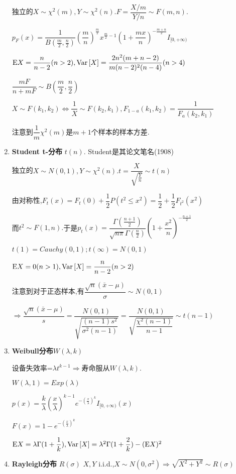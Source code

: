 \begin{enumerate}
   独立的$X\sim \chi^2(m),Y\sim\chi^2(n).F=\dfrac{X/m}{Y/n}\sim F(m,n).$

   $ p_{F}(x) =
   \dfrac{1}{B(\frac{m}{2},\frac{n}{2})}(\dfrac{m}{n})^{\frac{m}{2}}x^{\frac{m}{2}-1}(1+\dfrac{mx}{n})^{-\frac{m+n}{2}} I_{[0,+\infty)}$

   $ \text{E}X = \dfrac{n}{n-2}(n>2), \text{Var}\left[X\right] = \dfrac{2n^2(m+n-2)}{m(n-2)^2(n-4)}(n>4)$

   $ \dfrac{mF}{n+mF} \sim B(\dfrac{m}{2},\dfrac{n}{2})$

   $ X\sim F(k_1,k_2) \Leftrightarrow \dfrac{1}{X}\sim F(k_2,k_1) , F_{1-a}(k_1,k_2) = \dfrac{1}{F_a(k_2,k_1)}$

     注意到$ \dfrac{1}{m}\chi^2(m)$是$ m+1$个样本的样本方差.

   \item \textbf{Student t-分布} $ t(n)$. Student是其论文笔名(1908)

     独立的$X\sim N(0,1),Y\sim\chi^2(n).t=\dfrac{X}{\sqrt{\frac{Y}{n}}}\sim t(n) $

     由对称性,$ F_t(x)=F_t(0)+\dfrac{1}{2}P(t^2\le x^2)=\dfrac{1}{2}+\dfrac{1}{2}F_{t^2}(x^2)$

     而$ t^2\sim F(1,n).$于是$ p_t(x)=\dfrac{\Gamma(\frac{n+1}{2})}{\sqrt{n\pi}\Gamma(\frac{n}{2})}(1+\dfrac{x^2}{n})^{-\frac{n+1}{2}}$

     $t(1) = Cauchy(0,1) ;t(\infty)=N(0,1)$

     $ \text{E}X=0(n>1), \text{Var}\left[X\right]=\dfrac{n}{n-2}(n>2)$

     注意到对于正态样本,有$ \dfrac{\sqrt{n}(\bar{x}-\mu)}{\sigma}\sim N(0,1)$

     $ \Rightarrow \dfrac{\sqrt{n}(\bar{x}-\mu)}{s} =
   \dfrac{N(0,1)}{\sqrt{\dfrac{(n-1)s^2}{\sigma^2(n-1)}}} =
   \dfrac{N(0,1)}{\sqrt{\dfrac{\chi^2(n-1)}{n-1}}} \sim t(n-1)$
 \item \textbf{Weibull分布}$ W(\lambda,k)$

   设备失效率=$ \lambda t^{k-1}\Rightarrow  寿命服从W(\lambda,k). $

 $ W(\lambda,1) = Exp(\lambda)$

 $ p(x) = \dfrac{k}{\lambda}(\dfrac{x}{\lambda})^{k-1}e^{-(\frac{x}{\lambda})^k}I_{[0,+\infty)}(x)$

 $ F(x) = 1-e^{-(\frac{x}{\lambda})^k}$

 $ \text{E}X = \lambda \Gamma(1+\dfrac{1}{k}), \text{Var}\left[X\right] =
 \lambda^2\Gamma(1+\dfrac{2}{k})-(\text{E}X)^2$

\item \textbf{Rayleigh分布} $ R(\sigma)$
  $ X,Y$ i.i.d.,$ X\sim N(0, \sigma^2)\Rightarrow \sqrt{X^2+Y^2} \sim R(\sigma)$


\end{enumerate}
